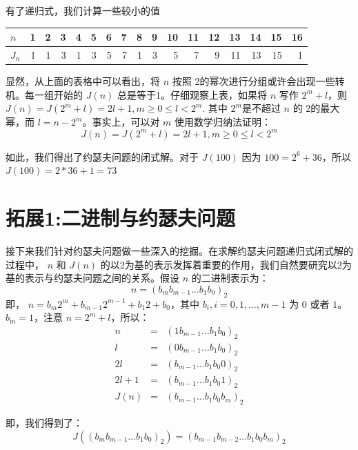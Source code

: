 \documentclass[10pt,a4paper,UTF8]{article}
\begin{document}
有了递归式，我们计算一些较小的值


\begin{center}
\begin{tabular}{lrrrrrrrrrrrrrrrr}
\(n\) & 1 & 2 & 3 & 4 & 5 & 6 & 7 & 8 & 9 & 10 & 11 & 12 & 13 & 14 & 15 & 16\\
\hline
\(J_{n}\) & 1 & 1 & 3 & 1 & 3 & 5 & 7 & 1 & 3 & 5 & 7 & 9 & 11 & 13 & 15 & 1\\
\end{tabular}
\end{center}


显然，从上面的表格中可以看出，将 \(n\) 按照 2的幂次进行分组或许会出现一些转机。每一组开始的 \(J(n)\) 总是等于1。仔细观察上表，如果将 \(n\) 写作 \(2^{m}+l\)，则 \(J(n)=J(2^{m}+l) = 2l +1, m\ge 0\le l < 2^{m}\). 其中 \(2^{m}\)是不超过 \(n\) 的 \(2\)的最大幂，而 \(l=n-2^{m}\)。事实上，可以对 \(m\) 使用数学归纳法证明：
\begin{equation}
\label{eq:4}
J(n)=J(2^{m}+l) = 2l +1, m\ge 0\le l < 2^{m}
\end{equation}

如此，我们得出了约瑟夫问题的闭式解。对于 \(J(100)\) 因为 \(100=2^{6}+36\)，所以 \(J(100)=2*36 +1= 73\)
\section{拓展1:二进制与约瑟夫问题}
\label{sec:orgheadline4}


接下来我们针对约瑟夫问题做一些深入的挖掘。在求解约瑟夫问题递归式闭式解的过程中， \(n\) 和 \(J(n)\) 的以2为基的表示发挥着重要的作用，我们自然要研究以2为基的表示与约瑟夫问题之间的关系。假设 \(n\) 的二进制表示为：
\begin{equation}
\label{eq:5}
n = (b_{m}b_{m-1}\ldots b_{1}b_{0})_{2}
\end{equation}
即， \(n = b_{m}2^{m} + b_{m-1}2^{m-1} + b_{1}2 + b_{0}\)，其中 \(b_{i}, i=0,1,\ldots,m-1\) 为 \(0\) 或者 \(1\)。  \(b_{m}=1\)，注意 \(n=2^{m}+l\)，所以：
\begin{eqnarray}
\label{eq:6}
n & = & (1b_{m-1}\ldots b_{1}b_{0})_{2} \\
l & = & (0b_{m-1}\ldots b_{1}b_{0})_{2} \\
2l& = & (b_{m-1}\ldots b_{1}b_{0}0)_{2} \\
2l+1& = & (b_{m-1}\ldots b_{1}b_{0}1)_{2} \\
J(n) & = & (b_{m-1}\ldots b_{1}b_{0}b_{m})_{2} 
\end{eqnarray}

即，我们得到了：
\begin{equation}
\label{eq:7}
J((b_{m}b_{m-1}\ldots b_{1}b_{0})_{2}) = (b_{m-1}b_{m-2}\ldots b_{1}b_{0}b_{m})_{2}
\end{equation}
\end{document}
